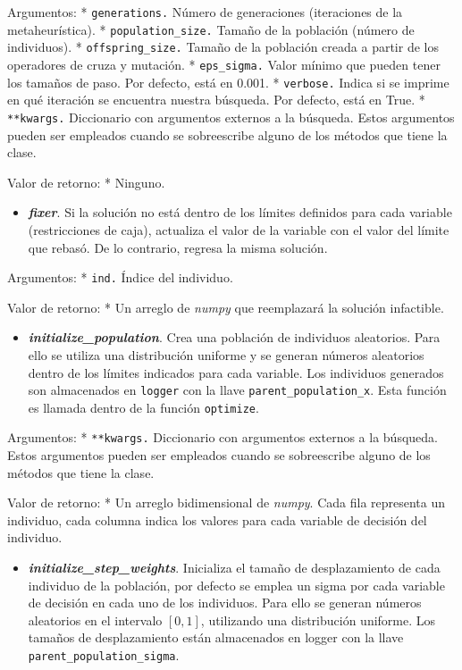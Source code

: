 \documentclass[11pt]{article}
\providecommand{\tightlist}{%
      \setlength{\itemsep}{0pt}\setlength{\parskip}{0pt}}
\begin{document}
Argumentos: * \texttt{generations.} Número de generaciones (iteraciones
de la metaheurística). * \texttt{population\_size.} Tamaño de la
población (número de individuos). * \texttt{offspring\_size.} Tamaño de
la población creada a partir de los operadores de cruza y mutación. *
\texttt{eps\_sigma.} Valor mínimo que pueden tener los tamaños de paso.
Por defecto, está en 0.001. * \texttt{verbose.} Indica si se imprime en
qué iteración se encuentra nuestra búsqueda. Por defecto, está en True.
* \texttt{**kwargs.} Diccionario con argumentos externos a la búsqueda.
Estos argumentos pueden ser empleados cuando se sobreescribe alguno de
los métodos que tiene la clase.

Valor de retorno: * Ninguno.

    \begin{itemize}
\tightlist
\item
  \emph{\textbf{fixer}}. Si la solución no está dentro de los límites
  definidos para cada variable (restricciones de caja), actualiza el
  valor de la variable con el valor del límite que rebasó. De lo
  contrario, regresa la misma solución.
\end{itemize}

Argumentos: * \texttt{ind.} Índice del individuo.

Valor de retorno: * Un arreglo de \emph{numpy} que reemplazará la
solución infactible.

    \begin{itemize}
\tightlist
\item
  \emph{\textbf{initialize\_population}}. Crea una población de
  individuos aleatorios. Para ello se utiliza una distribución uniforme
  y se generan números aleatorios dentro de los límites indicados para
  cada variable. Los individuos generados son almacenados en
  \texttt{logger} con la llave \texttt{parent\_population\_x}. Esta
  función es llamada dentro de la función \texttt{optimize}.
\end{itemize}

Argumentos: * \texttt{**kwargs.} Diccionario con argumentos externos a
la búsqueda. Estos argumentos pueden ser empleados cuando se
sobreescribe alguno de los métodos que tiene la clase.

Valor de retorno: * Un arreglo bidimensional de \emph{numpy}. Cada fila
representa un individuo, cada columna indica los valores para cada
variable de decisión del individuo.

    \begin{itemize}
\tightlist
\item
  \emph{\textbf{initialize\_step\_weights}}. Inicializa el tamaño de
  desplazamiento de cada individuo de la población, por defecto se
  emplea un sigma por cada variable de decisión en cada uno de los
  individuos. Para ello se generan números aleatorios en el intervalo
  \([0,1]\), utilizando una distribución uniforme. Los tamaños de
  desplazamiento están almacenados en logger con la llave
  \texttt{parent\_population\_sigma}.
\end{itemize}
\end{document}
